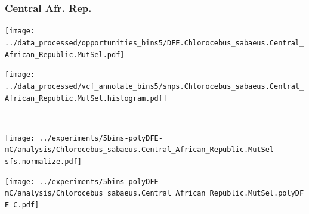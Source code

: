 \subsubsection{Central Afr. Rep.}

\begin{minipage}{0.49\linewidth}
    \texttt{[image: ../data\_processed/opportunities\_bins5/DFE.Chlorocebus\_sabaeus.Central\_African\_Republic.MutSel.pdf]}
\end{minipage}
\begin{minipage}{0.49\linewidth}
    \texttt{[image: ../data\_processed/vcf\_annotate\_bins5/snps.Chlorocebus\_sabaeus.Central\_African\_Republic.MutSel.histogram.pdf]}
\end{minipage}
\\
\begin{minipage}{0.49\linewidth}
    \texttt{[image: ../experiments/5bins-polyDFE-mC/analysis/Chlorocebus\_sabaeus.Central\_African\_Republic.MutSel-sfs.normalize.pdf]}
\end{minipage}
\begin{minipage}{0.4\linewidth}
    \texttt{[image: ../experiments/5bins-polyDFE-mC/analysis/Chlorocebus\_sabaeus.Central\_African\_Republic.MutSel.polyDFE\_C.pdf]}
\end{minipage}
